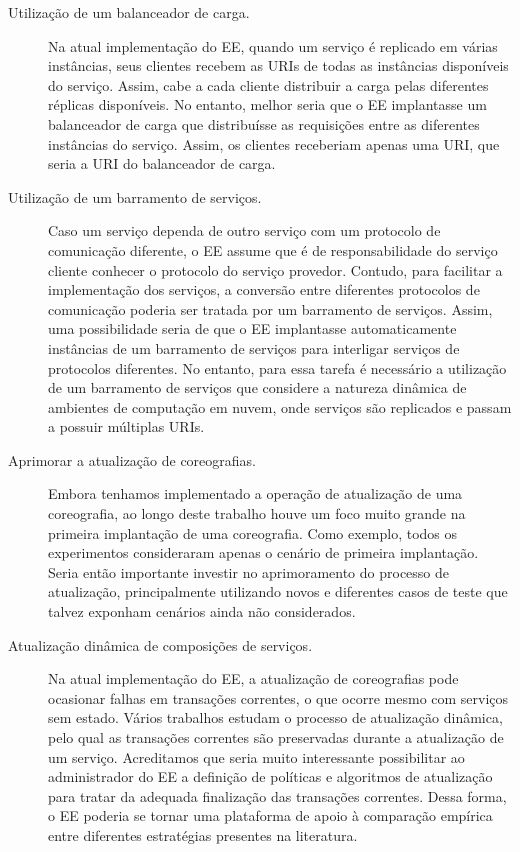 \begin{description}
\item[Utilização de um balanceador de carga.] Na atual implementação do EE,
quando um serviço é replicado em várias instâncias, seus clientes
recebem as URIs de todas as instâncias disponíveis do serviço.
Assim, cabe a cada cliente distribuir a carga pelas diferentes réplicas disponíveis.
No entanto, melhor seria que o EE implantasse um balanceador de carga 
que distribuísse as requisições entre as diferentes instâncias do serviço.
Assim, os clientes receberiam apenas uma URI, que seria a URI
do balanceador de carga.

\item[Utilização de um barramento de serviços.] Caso um serviço dependa
de outro serviço com um protocolo de comunicação diferente, o EE assume que é de
responsabilidade do serviço cliente conhecer o protocolo do serviço provedor.
Contudo, para facilitar a implementação dos serviços, a conversão entre
diferentes protocolos de comunicação poderia ser tratada por um barramento de serviços.
Assim, uma possibilidade seria de que o EE implantasse automaticamente instâncias
de um barramento de serviços para interligar serviços de protocolos diferentes.
No entanto, para essa tarefa é necessário a utilização de um barramento de serviços
que considere a natureza dinâmica de ambientes de computação em nuvem,
onde serviços são replicados e passam a possuir múltiplas URIs.

\item[Aprimorar a atualização de coreografias.] Embora 
tenhamos implementado a operação de atualização de uma coreografia,
ao longo deste trabalho houve um foco muito grande na primeira implantação
de uma coreografia. Como exemplo, todos os experimentos consideraram apenas 
o cenário de primeira implantação.
Seria então importante investir no aprimoramento do processo de atualização,
principalmente utilizando novos e diferentes casos de teste que talvez exponham
cenários ainda não considerados. 

\item[Atualização dinâmica de composições de serviços.] Na atual implementação do EE,
a atualização de coreografias pode ocasionar falhas em transações correntes,
o que ocorre mesmo com serviços sem estado.
Vários trabalhos \cite{Kramer1990Philosophers, Vandewoude2007Tranquility, Xiaoxing2011VersionConsistent} 
estudam o processo de atualização dinâmica, pelo qual as transações correntes 
são preservadas durante a atualização de um serviço. 
Acreditamos que seria muito interessante possibilitar ao administrador do EE
a definição de políticas e algoritmos de atualização para 
tratar da adequada finalização das transações correntes.
Dessa forma, o EE poderia se tornar uma plataforma de apoio
à comparação empírica entre diferentes estratégias presentes na literatura.

\end{description}

